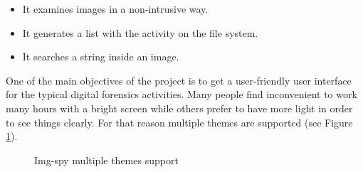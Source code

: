 \begin{itemize}
	\item[] 
	It examines images in a non-intrusive way.

	\item[] 
	It generates a list with the activity on the file system.

	\item[] 
	It searches a string inside an image.

\end{itemize}

One of the main objectives of the project is to get a user-friendly user
interface for the typical digital forensics activities. Many people find
inconvenient to work many hours with a bright screen while others prefer to
have more light in order to see things clearly. For that reason multiple themes
are supported (see Figure \ref{F:img-spy-multi-theme}). 

\begin{figure}[htb]
	\begin{center}
		\begin{subfigmatrix}{1}
		\end{subfigmatrix}
		\caption{Img-spy  multiple themes support}
		\label{F:img-spy-multi-theme}
	\end{center}
\end{figure}

